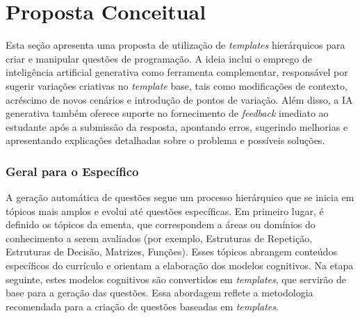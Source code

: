 \chapter{Proposta Conceitual}

Esta seção apresenta uma proposta de utilização de \textit{templates} hierárquicos para criar e manipular questões de programação. A ideia inclui o emprego de inteligência artificial generativa como ferramenta complementar, responsável por sugerir variações criativas no \textit{template} base, tais como modificações de contexto, acréscimo de novos cenários e introdução de pontos de variação. Além disso, a IA generativa também oferece suporte no fornecimento de \textit{feedback} imediato ao estudante após a submissão da resposta, apontando erros, sugerindo melhorias e apresentando explicações detalhadas sobre o problema e possíveis soluções. 

\subsection{Geral para o Específico}
A geração automática de questões segue um processo hierárquico que se inicia em tópicos mais amplos e evolui até questões específicas. Em primeiro lugar, é definido os tópicos da ementa, que correspondem a áreas ou domínios do conhecimento a serem avaliados (por exemplo, Estruturas de Repetição, Estruturas de Decisão, Matrizes, Funções). Esses tópicos abrangem conteúdos específicos do currículo e orientam a elaboração dos modelos cognitivos. Na etapa seguinte, estes modelos cognitivos são convertidos em \textit{templates}, que servirão de base para a geração das questões. Essa abordagem reflete a metodologia recomendada para a criação de questões baseadas em \textit{templates}. 

